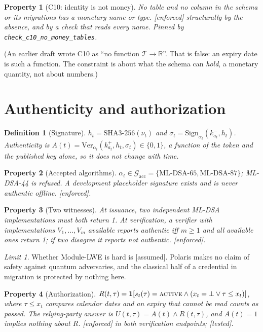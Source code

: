 \documentclass[11pt]{article}
\newtheorem{property}{Property}
\newtheorem{definition}{Definition}
\theoremstyle{remark}
\newtheorem*{limit}{Limit}
\newcommand{\Tok}{\mathcal T}
\newcommand{\Alg}{\mathcal G}
\newcommand{\bool}{\{0,1\}}
\newcommand{\one}{\mathbf 1}
\newcommand{\code}[1]{\texttt{#1}}
\newcommand{\emark}[1]{\textup{\textsf{[#1]}}}
\newcommand{\st}[1]{\textup{\textsc{#1}}}
\begin{document}
\begin{property}[C10: identity is not money] No table and no column in the schema or its migrations
has a monetary name or type. \emark{enforced} structurally by the absence, and by a check that reads
every name. Pinned by \code{check\_c10\_no\_money\_tables}.
\end{property}
\noindent(An earlier draft wrote C10 as ``no function $\Tok\to\mathbb R$''. That is false: an expiry date
is such a function. The constraint is about what the schema can \emph{hold}, a monetary quantity,
not about numbers.)

\section{Authenticity and authorization}

\begin{definition}[Signature] $h_t=\mathrm{SHA3\text{-}256}(\nu_t)$ and
$\sigma_t=\mathrm{Sign}_{\alpha_t}(k^-_{a_t},h_t)$. Authenticity is
$A(t)=\mathrm{Ver}_{\alpha_t}(k^+_{a_t},h_t,\sigma_t)\in\bool$, a function of the token and the
published key alone, so it does not change with time.
\end{definition}

\begin{property}[Accepted algorithms] $\alpha_t\in\Alg_{\mathrm{acc}}=\{\text{ML-DSA-65},\text{ML-DSA-87}\}$;
ML-DSA-44 is refused. A development placeholder signature exists and is never authentic offline.
\emark{enforced}.
\end{property}

\begin{property}[Two witnesses] At issuance, two independent ML-DSA implementations must both return
1. At verification, a verifier with implementations $V_1,\dots,V_m$ available reports authentic iff
$m\ge1$ and all available ones return 1; if two disagree it reports not authentic. \emark{enforced}.
\end{property}
\begin{limit}
Whether Module-LWE is hard is \emark{assumed}. Polaris makes no claim of safety against quantum
adversaries, and the classical half of a credential in migration is protected by nothing here.
\end{limit}

\begin{property}[Authorization]\label{p:auth} $R(t,\tau)=\one[s_t(\tau)=\st{active}\wedge
(x_t=\bot\vee \tau\le x_t)]$, where $\tau\le x_t$ compares calendar dates and an expiry that cannot
be read counts as passed. The relying-party answer is $U(t,\tau)=A(t)\wedge R(t,\tau)$, and
$A(t)=1$ implies nothing about $R$. \emark{enforced} in both verification endpoints; \emark{tested}.
\end{property}
\end{document}
